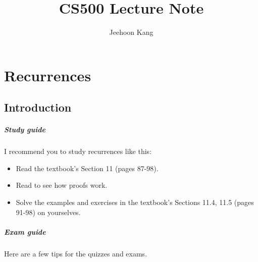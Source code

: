 \documentclass[11pt,a4paper,oneside,microtype,chapter,nokorean]{oblivoir}
\begin{document}
\title{CS500 Lecture Note}
\author{Jeehoon Kang}
\maketitle


\chapter{Recurrences}

\section{Introduction}

\paragraph{Study guide}

I recommend you to study recurrences like this:

\begin{itemize}
\item Read the textbook's Section 11 (pages 87-98).
\item Read  to see how proofs work.
\item Solve the examples and exercises in the textbook's Sections 11.4, 11.5 (pages 91-98) on
  yourselves.
\end{itemize}


\paragraph{Exam guide}

Here are a few tips for the quizzes and exams.
\end{document}
